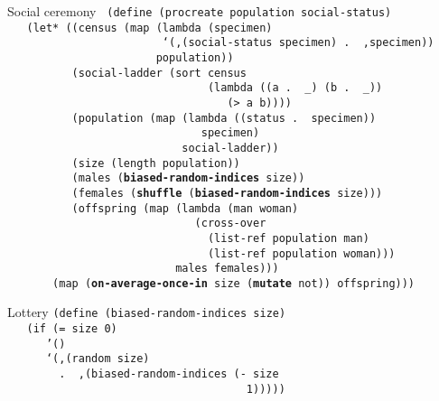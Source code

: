 \documentclass{beamer}
\begin{document}
\begin{frame}{Social ceremony}
  \texttt{\scriptsize
(define (procreate population social-status)\\ 
\ \ \ (let* ((census (map (lambda (specimen)\\
\ \ \ \ \ \ \ \ \ \ \ \ \ \ \ \ \ \ \ \ \ \ \ \
`(,(social-status specimen)\,.\,\,,specimen))\\
\ \ \ \ \ \ \ \ \ \ \ \ \ \ \ \ \ \ \ \ \ \ \ population))\\ 
\ \ \ \ \ \ \ \ \ \ (social-ladder (sort census \\
\ \ \ \ \ \ \ \ \ \ \ \ \ \ \ \ \ \ \ \ \ \ \ \ \ \ \ \ \ \ \ 
(lambda ((a .\,\,\_) (b .\,\,\_))\\
\ \ \ \ \ \ \ \ \ \ \ \ \ \ \ \ \ \ \ \ \ \ \ \ \ \ \ \ \ \ \ \ \ \
(> a b))))\\ 
\ \ \ \ \ \ \ \ \ \ (population (map (lambda ((status .\,\,specimen))\\
\ \ \ \ \ \ \ \ \ \ \ \ \ \ \ \ \ \ \ \ \ \ \ \ \ \ \ \ \ \ specimen)\\
\ \ \ \ \ \ \ \ \ \ \ \ \ \ \ \ \ \ \ \ \ \ \ \ \ \ \ social-ladder))\\ 
\ \ \ \ \ \ \ \ \ \ (size (length population))\\ 
\ \ \ \ \ \ \ \ \ \ (males (\textbf{biased-random-indices} size))\\ 
\ \ \ \ \ \ \ \ \ \ (females (\textbf{shuffle}
(\textbf{biased-random-indices} size)))\\ 
\ \ \ \ \ \ \ \ \ \ (offspring (map (lambda (man woman)\\
\ \ \ \ \ \ \ \ \ \ \ \ \ \ \ \ \ \ \ \ \ \ \ \ \ \ \ \ \
(cross-over \\
\ \ \ \ \ \ \ \ \ \ \ \ \ \ \ \ \ \ \ \ \ \ \ \ \ \ \ \ \ \ \
(list-ref population man)\\
\ \ \ \ \ \ \ \ \ \ \ \ \ \ \ \ \ \ \ \ \ \ \ \ \ \ \ \ \ \ \
(list-ref population woman)))\\
\ \ \ \ \ \ \ \ \ \ \ \ \ \ \ \ \ \ \ \ \ \ \ \ \ \
males females)))\\ 
\ \ \ \ \ \ \
(map (\textbf{on-average-once-in} size (\textbf{mutate} not)) offspring)))
}
\end{frame}

\begin{frame}{Lottery}
  \texttt{(define (biased-random-indices size)\\ \pause
\ \ \ (if (= size 0)\\
\ \ \ \ \ \ '()\\ \pause
\ \ \ \ \ \ `(,(random size)\\
\ \ \ \ \ \ \ \ .\,\,,(biased-random-indices (- size\\
\ \ \ \ \ \ \ \ \ \ \ \ \ \ \ \ \ \ \ \ \ \ \ \ \ \ \ \ \ \ \ \ \ \ \ \ \ 1)))))
  }
\end{frame}
\end{document}
